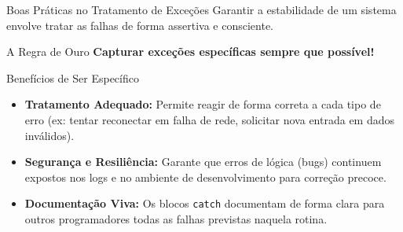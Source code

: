 \documentclass[9pt]{beamer}
\begin{document}
\begin{frame}{Boas Práticas no Tratamento de Exceções}
    Garantir a estabilidade de um sistema envolve tratar as falhas de forma assertiva e consciente.
    
    \vspace{0.3cm}
    
    \begin{alertblock}{A Regra de Ouro}
        \centering\large\bfseries
        Capturar exceções específicas sempre que possível!
    \end{alertblock}
    
    \vspace{0.2cm}
    
    \begin{block}{Benefícios de Ser Específico}
        \begin{itemize}
            \item \textbf{Tratamento Adequado:} Permite reagir de forma correta a cada tipo de erro (ex: tentar reconectar em falha de rede, solicitar nova entrada em dados inválidos).
            \item \textbf{Segurança e Resiliência:} Garante que erros de lógica (bugs) continuem expostos nos logs e no ambiente de desenvolvimento para correção precoce.
            \item \textbf{Documentação Viva:} Os blocos \texttt{catch} documentam de forma clara para outros programadores todas as falhas previstas naquela rotina.
        \end{itemize}
    \end{block}
\end{frame}
\end{document}
